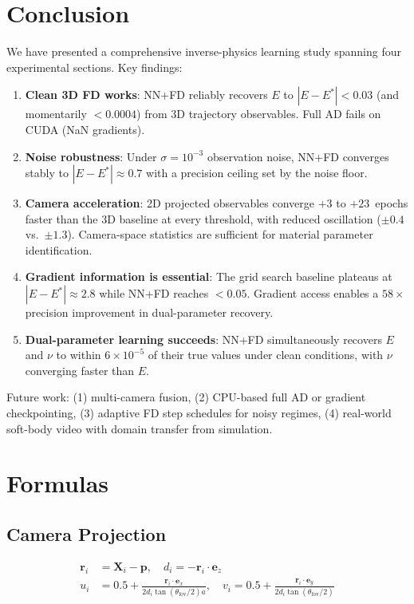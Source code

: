 \documentclass{article}
\begin{document}
\section{Conclusion}

We have presented a comprehensive inverse-physics learning study spanning
four experimental sections.  Key findings:

\begin{enumerate}[itemsep=2pt]
\item \textbf{Clean 3D FD works}: NN+FD reliably recovers $E$ to
  $|E-E^*|<0.03$ (and momentarily $<0.0004$) from 3D trajectory
  observables.  Full AD fails on CUDA (NaN gradients).
\item \textbf{Noise robustness}: Under $\sigma=10^{-3}$ observation noise,
  NN+FD converges stably to $|E-E^*|\approx0.7$ with a precision ceiling
  set by the noise floor.
\item \textbf{Camera acceleration}: 2D projected observables converge
  $+3$ to $+23$~epochs faster than the 3D baseline at every threshold,
  with reduced oscillation ($\pm0.4$ vs.\ $\pm1.3$).  Camera-space
  statistics are sufficient for material parameter identification.
\item \textbf{Gradient information is essential}: The grid search baseline
  plateaus at $|E-E^*|\approx2.8$ while NN+FD reaches $<0.05$.  Gradient
  access enables a $58\times$ precision improvement in dual-parameter
  recovery.
\item \textbf{Dual-parameter learning succeeds}: NN+FD simultaneously
  recovers $E$ and $\nu$ to within $6\times10^{-5}$ of their true values
  under clean conditions, with $\nu$ converging faster than $E$.
\end{enumerate}

Future work: (1) multi-camera fusion, (2) CPU-based full AD or gradient
checkpointing, (3) adaptive FD step schedules for noisy regimes,
(4) real-world soft-body video with domain transfer from simulation.


\appendix

\section{Formulas}

\subsection{Camera Projection}
\begin{align}
\mathbf{r}_i &= \mathbf{X}_i - \mathbf{p}, \quad
d_i = -\mathbf{r}_i\cdot\mathbf{e}_z \label{eq:proj1}\\
u_i &= 0.5 + \frac{\mathbf{r}_i\cdot\mathbf{e}_x}{2d_i\tan(\theta_{\text{fov}}/2)a},
\quad v_i = 0.5 + \frac{\mathbf{r}_i\cdot\mathbf{e}_y}{2d_i\tan(\theta_{\text{fov}}/2)} \label{eq:proj2}
\end{align}
\end{document}
